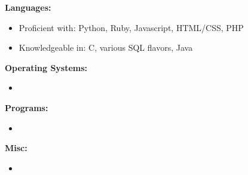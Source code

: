 \else


{\bf Languages:}
\begin{itemize}
\item Proficient with: Python, Ruby, Javascript, HTML/CSS, PHP
\item Knowledgeable in: C, various SQL flavors, Java
\end{itemize}

{\bf Operating Systems:}
\begin{itemize}
\item
\end{itemize}

{\bf Programs:}
\begin{itemize}
\item
\end{itemize}

{\bf Misc:}
\begin{itemize}
\item
\end{itemize}


\fi

\
